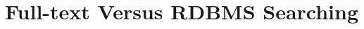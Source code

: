 





%
%
%
%
%
%
%
%
%
%
%
%
%
%
%
%

\section{Full-text Versus RDBMS Searching}
\label{sec:fullVsDb}

